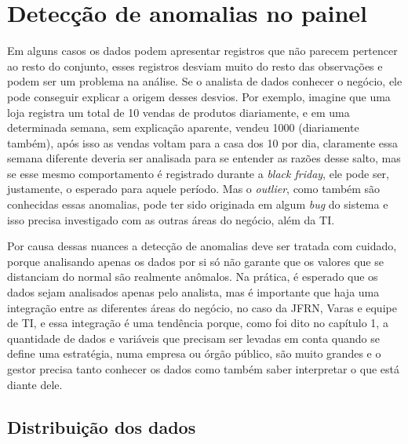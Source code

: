 \chapter{Detecção de anomalias no painel}\label{cap_trabalho_academico}

Em alguns casos os dados podem apresentar registros que não parecem pertencer ao resto do conjunto, esses registros desviam muito do resto das observações e podem ser um problema na análise. Se o analista de dados conhecer o negócio, ele pode conseguir explicar a origem desses desvios. Por exemplo, imagine que uma loja registra um total de 10 vendas de produtos diariamente, e em uma determinada semana, sem explicação aparente, vendeu 1000 (diariamente também), após isso as vendas voltam para a casa dos 10 por dia, claramente essa semana diferente deveria ser analisada para se entender as razões desse salto, mas se esse mesmo comportamento é registrado durante a \textit{black friday}, ele pode ser, justamente, o esperado para aquele período. Mas o \textit{outlier}, como também são conhecidas essas anomalias, pode ter sido originada em algum \textit{bug} do sistema e isso precisa investigado com as outras áreas do negócio, além da TI.

Por causa dessas nuances a detecção de anomalias deve ser tratada com cuidado, porque analisando apenas os dados por si só não garante que os valores que se distanciam do normal são realmente anômalos. Na prática, é esperado que os dados sejam analisados apenas pelo analista, mas é importante que haja uma integração entre as diferentes áreas do negócio, no caso da JFRN, Varas e equipe de TI, e essa integração é uma tendência porque, como foi dito no capítulo 1, a quantidade de dados e variáveis que precisam ser levadas em conta quando se define uma estratégia, numa empresa ou órgão público, são muito grandes e o gestor precisa tanto conhecer os dados como também saber interpretar o que está diante dele. 

\section{Distribuição dos dados}

